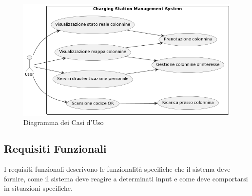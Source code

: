 \begin{figure}[htbp]
    \centering
    \includegraphics[width=\textwidth]{../images/casiduso.png}
    \caption{Diagramma dei Casi d'Uso}
    \label{fig:casiduso}
\end{figure}

\subsection{Requisiti Funzionali}
I requisiti funzionali descrivono le funzionalità specifiche che il sistema deve fornire,
come il sistema deve reagire a determinati input e come deve comportarsi in situazioni specifiche.\\


